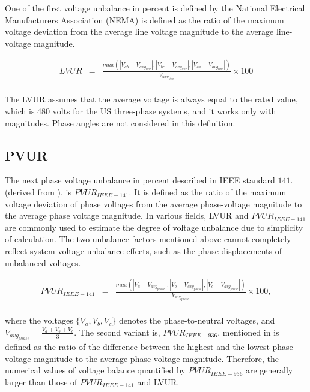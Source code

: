 	One of the first voltage unbalance in percent is defined by the National Electrical Manufacturers Association (NEMA) \cite{bonnett1997understanding} is defined  as the ratio of the maximum voltage deviation from the average line voltage magnitude to the average line-voltage magnitude.
	
\begin{equation}
        \begin{array}{rcl}
            LVUR&=&\frac{max\left( |V_{ab}-V_{avg_{line}}|,|V_{bc}-V_{avg_{line}}|,|V_{ca}-V_{avg_{line}}| \right)}{V_{avg_{line}}}\times100\\			
        \end{array}
        \label{BASICUNB:equ:LVUR}
    \end{equation}
		
		The LVUR assumes that the average voltage is always equal to the rated value, which is 480 volts for the US three-phase systems, and it works only with magnitudes. Phase angles are not considered in this definition.
	
	\subsection{PVUR}
	
	The next phase voltage unbalance in percent described in IEEE standard $141.$ \cite{IEEE_141_35071} (derived from \cite{IEEE_112_8635630}), is $PVUR_{IEEE-141}$. It is defined as the ratio of the maximum voltage deviation of phase voltages from the average phase-voltage magnitude to the average phase voltage magnitude. In various fields, LVUR and $PVUR_{IEEE-141}$ are commonly used to estimate the degree of voltage unbalance due to simplicity of calculation. The two unbalance factors mentioned above cannot completely reflect system voltage unbalance effects, such as the phase displacements of unbalanced voltages.
	
	\begin{equation}
        \begin{array}{rcl}
            PVUR_{IEEE-141}&=&\frac{max\left( |V_{a}-V_{avg_{phase}}|,|V_{b}-V_{avg_{phase}}|,|V_{c}-V_{avg_{phase}}| \right)}{V_{avg_{phase}}}\times100,\\
        \end{array}
        \label{BASICUNB:equ:PVUR-141}
    \end{equation}

where the voltages $\{V_{a},V_{b},V_{c}\}$ denotes the phase-to-neutral voltages, and $V_{avg_{phase}}=\frac{V_{a}+V_{b}+V_{c}}{3}$.
The second variant is, $PVUR_{IEEE-936}$, mentioned in \cite{IEEE_936_29053} is defined as the ratio of the difference between the highest and the lowest phase-voltage magnitude to the average phase-voltage magnitude. Therefore, the numerical values of voltage balance quantified by $PVUR_{IEEE-936}$ are generally larger than those of $PVUR_{IEEE-141}$ and LVUR. 

